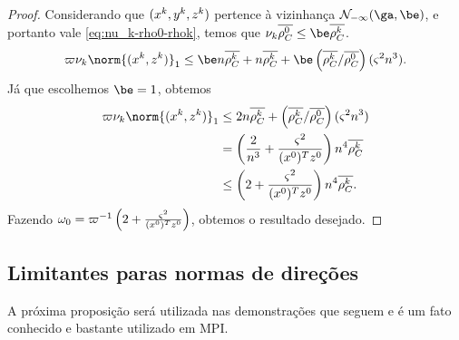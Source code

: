 \begin{proof}
Considerando que $(x^{k},y^{k},z^{k})$ pertence à vizinhança $\Nset_{-\infty}(\ga,\be)$, e portanto vale  \eqref{eq:nu_k-rho0-rhok}, temos que $\nu_k \dbvec{\rho_C^0} \leq \be \dbvec{\rho_C^{k}}$. 
\[
	\bdxzzero\nu_k\norm{(\xk,\zk)}_{1}   \leq \be n\dbvec{\rho_C^{k}}+ n\dbvec{\rho_C^{k}} + \be\left(\dbvec{\rho_C^{k}}/\dbvec{\rho_C^{0}}\right)(\bdxzstar^{2} n^3  ). 
\]Já que escolhemos $\be=1$, obtemos 
\[
\begin{aligned}
	\bdxzzero\nu_k\norm{(\xk,\zk)}_{1}  & \leq 2 n\dbvec{\rho_C^{k}}+ \left(\dbvec{\rho_C^{k}}/\dbvec{\rho_C^{0}}\right)(\bdxzstar^{2} n^3  ) \\	
								 &= \left(\frac{2}{n^{3}}  + \frac{\bdxzstar^{2}}{(\xzero)^{T}\zzero}\right)  n^{4}\dbvec{\rho_C^{k}} \\
								 &  \leq \left(2  + \frac{\bdxzstar^{2}}{(\xzero)^{T}\zzero}\right)  n^{4}\dbvec{\rho_C^{k}}.								
\end{aligned}
\]
Fazendo $\omega_{0} = \varpi^{-1}\left(2  + \frac{\varsigma^{2}}{(x^0)^{T}z^0}\right)$, obtemos o resultado desejado.
\end{proof}




\subsection{Limitantes paras normas de direções} 

A próxima proposição será utilizada nas demonstrações que seguem e é um fato conhecido e bastante utilizado em \ac{MPI}.

